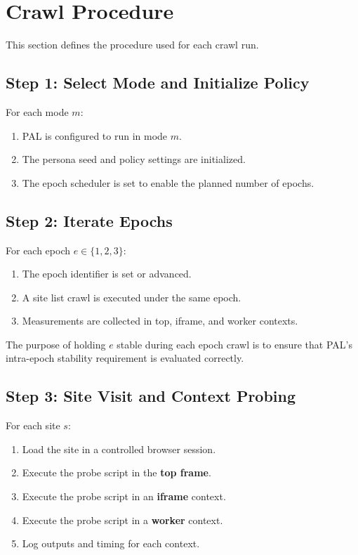 \documentclass[11pt]{report}
\begin{document}
\section{Crawl Procedure}

This section defines the procedure used for each crawl run.

\subsection{Step 1: Select Mode and Initialize Policy}

For each mode $m$:
\begin{enumerate}
    \item PAL is configured to run in mode $m$.
    \item The persona seed and policy settings are initialized.
    \item The epoch scheduler is set to enable the planned number of epochs.
\end{enumerate}

\subsection{Step 2: Iterate Epochs}

For each epoch $e \in \{1,2,3\}$:
\begin{enumerate}
    \item The epoch identifier is set or advanced.
    \item A site list crawl is executed under the same epoch.
    \item Measurements are collected in top, iframe, and worker contexts.
\end{enumerate}

The purpose of holding $e$ stable during each epoch crawl is to ensure that PAL’s intra-epoch stability requirement is evaluated correctly.

\subsection{Step 3: Site Visit and Context Probing}

For each site $s$:

\begin{enumerate}
    \item Load the site in a controlled browser session.
    \item Execute the probe script in the \textbf{top frame}.
    \item Execute the probe script in an \textbf{iframe} context.
    \item Execute the probe script in a \textbf{worker} context.
    \item Log outputs and timing for each context.
\end{enumerate}
\end{document}
